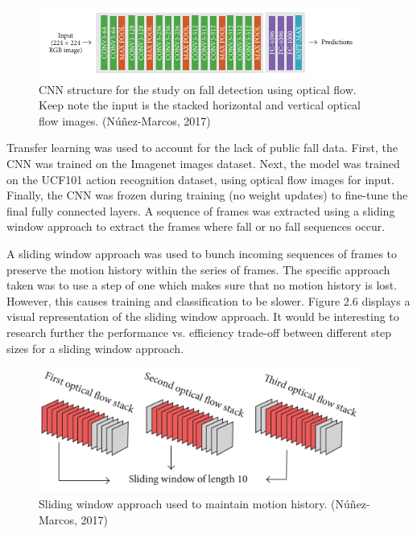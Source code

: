 \begin{figure}[H]
    \centering
    \includegraphics[width=400px, keepaspectratio]{othercnn.png}
    \vspace{1ex}%
    \caption{CNN structure for the study on fall detection using optical flow. Keep note the input is the stacked horizontal and vertical optical flow images. (Núñez-Marcos, 2017)}
    \label{fig:my_label}
\end{figure}


Transfer learning was used to account for the lack of public fall data. First, the CNN was trained on the Imagenet images dataset. Next, the model was trained on the UCF101 action recognition dataset, using optical flow images for input. Finally, the CNN was frozen during training (no weight updates) to fine-tune the final fully connected layers. A sequence of frames was extracted using a sliding window approach to extract the frames where fall or no fall sequences occur.

A sliding window approach was used to bunch incoming sequences of frames to preserve the motion history within the series of frames. The specific approach taken was to use a step of one which makes sure that no motion history is lost. However, this causes training and classification to be slower. Figure 2.6 displays a visual representation of the sliding window approach. It would be interesting to research further the performance vs. efficiency trade-off between different step sizes for a sliding window approach.

\begin{figure}[H]
    \centering
    \includegraphics[width=400px, keepaspectratio]{aaaaa.png}
    \vspace{1ex}%
    \caption{Sliding window approach used to maintain motion history. (Núñez-Marcos, 2017)}
    \label{fig:my_label}
\end{figure}

